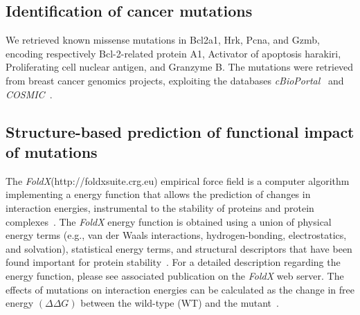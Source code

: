 \documentclass[10pt,letterpaper]{article}
\begin{document}
\subsection*{Identification of cancer mutations}
We retrieved known missense mutations in Bcl2a1, Hrk, Pcna, and Gzmb, encoding respectively Bcl-2-related protein A1, Activator of apoptosis harakiri, Proliferating cell nuclear antigen, and Granzyme B. The mutations were retrieved from breast cancer genomics projects, exploiting the databases \textit{cBioPortal}~\cite{Cerami2012} and \textit{COSMIC}~\cite{Forbes2017}.

\subsection*{Structure-based prediction of functional impact of mutations}
The \textit{FoldX}(http://foldxsuite.crg.eu) empirical force field is a computer algorithm implementing a energy function that allows the prediction of changes in interaction energies, instrumental to the stability of proteins and protein complexes~\cite{Guerois2002, Schymkowitz2005}. The \textit{FoldX} energy function is obtained using a union of physical energy terms (e.g., van der Waals interactions, hydrogen-bonding, electrostatics, and solvation), statistical energy terms, and structural descriptors that have been found important for protein stability~\cite{Kiel2014, Tokuriki2007}. 
For a detailed description regarding the energy function, please see associated publication on the \textit{FoldX} web server.  
The effects of mutations on interaction energies can be calculated as the change in free energy $(\Delta\Delta G)$ between the wild-type (WT) and the mutant~\cite{Guerois2002}.
\end{document}
